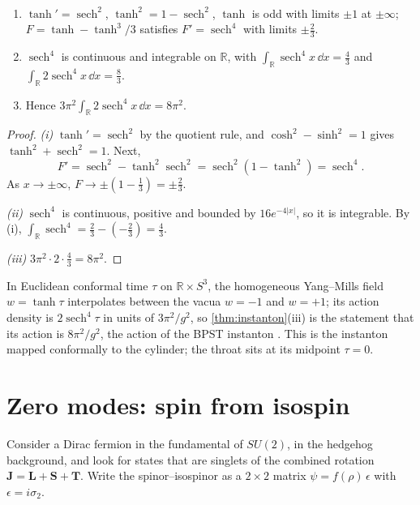 \begin{theorem}\label{thm:instanton}\ver\
\begin{enumerate}[label=(\roman*)]
\item $\tanh'=\operatorname{sech}^2$, $\tanh^2=1-\operatorname{sech}^2$, $\tanh$ is odd with limits $\pm1$ at $\pm\infty$; $F=\tanh-\tanh^3/3$ satisfies $F'=\operatorname{sech}^4$ with limits $\pm\frac23$.
\item $\operatorname{sech}^4$ is continuous and integrable on $\mathbb R$, with $\int_{\mathbb R}\operatorname{sech}^4x\,\dd x=\frac43$ and $\int_{\mathbb R}2\operatorname{sech}^4x\,\dd x=\frac83$.
\item Hence $3\pi^2\int_{\mathbb R}2\operatorname{sech}^4x\,\dd x=8\pi^2$.
\end{enumerate}
\end{theorem}
\begin{proof}
\emph{(i)} $\tanh'=\operatorname{sech}^2$ by the quotient rule, and $\cosh^2-\sinh^2=1$ gives $\tanh^2+\operatorname{sech}^2=1$. Next,
\[
F'=\operatorname{sech}^2-\tanh^2\operatorname{sech}^2=\operatorname{sech}^2(1-\tanh^2)=\operatorname{sech}^4 .
\]
As $x\to\pm\infty$, $F\to\pm(1-\frac13)=\pm\frac23$.

\emph{(ii)} $\operatorname{sech}^4$ is continuous, positive and bounded by $16e^{-4|x|}$, so it is integrable. By (i), $\int_{\mathbb R}\operatorname{sech}^4=\frac23-(-\frac23)=\frac43$.

\emph{(iii)} $3\pi^2\cdot2\cdot\frac43=8\pi^2$.
\end{proof}


In Euclidean conformal time $\tau$ on $\mathbb R\times S^3$, the homogeneous Yang--Mills field $w=\tanh\tau$ interpolates between the vacua $w=-1$ and $w=+1$; its action density is $2\operatorname{sech}^4\tau$ in units of $3\pi^2/g^2$, so \cref{thm:instanton}(iii) is the statement that its action is $8\pi^2/g^2$, the action of the BPST instanton \cite{BPST1975}. This is the instanton mapped conformally to the cylinder; the throat sits at its midpoint $\tau=0$.

\section{Zero modes: spin from isospin}

Consider a Dirac fermion in the fundamental of $SU(2)$, in the hedgehog background, and look for states that are singlets of the combined rotation $\mathbf J=\mathbf L+\mathbf S+\mathbf T$. Write the spinor--isospinor as a $2\times2$ matrix $\psi=f(\rho)\,\epsilon$ with $\epsilon=i\sigma_2$.

